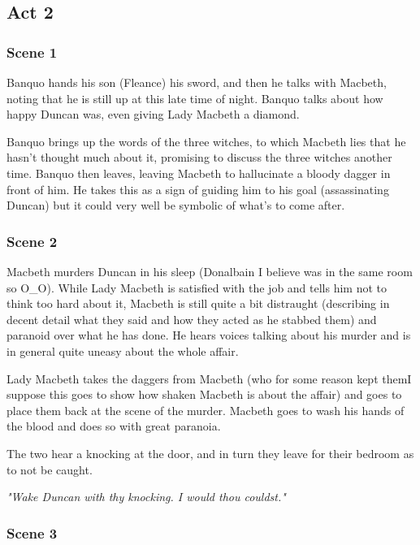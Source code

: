 \subsection{Act 2}

\subsubsection{Scene 1}

Banquo hands his son (Fleance) his sword, and then he talks with Macbeth, noting that he is still up at this late time of night. Banquo talks about how happy Duncan was, even giving Lady Macbeth a diamond.

Banquo brings up the words of the three witches, to which Macbeth lies that he
hasn't thought much about it, promising to discuss the three witches another
time. Banquo then leaves, leaving Macbeth to hallucinate a bloody dagger in
front of him. He takes this as a sign of guiding him to his goal (assassinating
Duncan) but it could very well be symbolic of what's to come after.

\subsubsection{Scene 2}

Macbeth murders Duncan in his sleep (Donalbain I believe was in the same room so O\_O). While Lady Macbeth is satisfied with the
job and tells him not to think too hard about it, Macbeth is still quite a bit
distraught (describing in decent detail what they said and how they acted as he
stabbed them) and paranoid over what he has done. He hears voices talking about
his murder and is in general quite uneasy about the whole affair.

Lady Macbeth takes the daggers from Macbeth (who for some reason kept
them\textemdash I suppose this goes to show how shaken Macbeth is about the
affair) and goes to place them back at the scene of the murder. Macbeth goes to wash his hands of the blood and does so with great paranoia.

The two hear a knocking at the door, and in turn they leave for their bedroom as to not be caught.

\textit{"Wake Duncan with thy knocking. I would thou couldst."}

\subsubsection{Scene 3}

